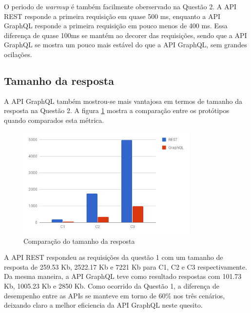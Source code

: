 O periodo de \textit{warmup} é também facilmente oberservado na Questão 2. A API REST responde a primeira requisição em quase 500 ms, enquanto a API GraphQL responde a primeira requisição em pouco menos de 400 ms. Essa diferença de quase 100ms se mantém ao decorer das requisições, sendo que a API GraphQL se mostra um pouco mais estável do que a API GraphQL, sem grandes ocilações.

\subsection{Tamanho da resposta}

A API GraphQL também mostrou-se mais vantajosa em termos de tamanho da resposta na Questão 2. A figura \ref{fig:q2-size} mostra a comparação entre os protótipos quando comparados esta métrica.

\begin{figure}[htbp]
    \centering
    \includegraphics[width=0.8\textwidth]{figuras/q1-size.png}
    \caption{Comparação do tamanho da resposta}
    \label{fig:q2-size}
    \author{fonte: Autor}
\end{figure}

A API REST respondeu as requisições da questão 1 com um tamanho de resposta de 259.53 Kb, 2522.17 Kb e 7221 Kb para C1, C2 e C3 respectivamente. Da mesma maneira, a API GraphQL teve como resultado respostas com 101.73 Kb, 1005.23 Kb e 2850 Kb. Como ocorrido da Questão 1, a diferença de desempenho entre as APIs se manteve em torno de 60\% nos três cenários, deixando claro a melhor eficiencia da API GraphQL neste quesito.